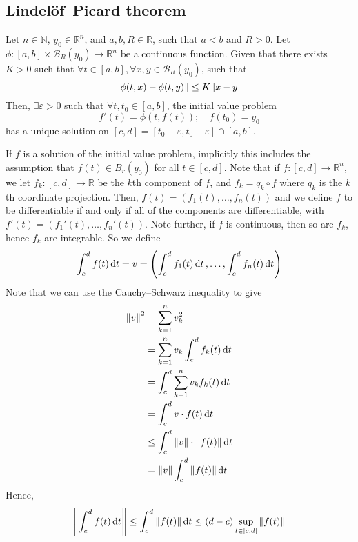 \subsection{Lindel\"of--Picard theorem}
\begin{theorem}
	Let \( n \in \mathbb N \), \( y_0 \in \mathbb R^n \), and \( a,b,R \in \mathbb R \), such that \( a < b \) and \( R > 0 \).
	Let \( \phi \colon [a,b] \times \mathcal B_R(y_0) \to \mathbb R^n \) be a continuous function.
	Given that there exists \( K > 0 \) such that \( \forall t \in [a,b], \forall x,y \in \mathcal B_R(y_0) \), such that
	\[
		\norm{\phi(t,x) - \phi(t,y)} \leq K \norm{x-y}
	\]
	Then, \( \exists \varepsilon > 0 \) such that \( \forall t, t_0 \in [a,b] \), the initial value problem
	\[
		f'(t) = \phi(t, f(t));\quad f(t_0) = y_0
	\]
	has a unique solution on \( [c,d] = [t_0 - \varepsilon, t_0 + \varepsilon] \cap [a,b] \).
\end{theorem}
\begin{remark}
	If \( f \) is a solution of the initial value problem, implicitly this includes the assumption that \( f(t) \in B_r(y_0) \) for all \( t \in [c,d] \).
	Note that if \( f \colon [c,d] \to \mathbb R^n \), we let \( f_k \colon [c,d] \to \mathbb R \) be the \( k \)th component of \( f \), and \( f_k = q_k \circ f \) where \( q_k \) is the \( k \)th coordinate projection.
	Then, \( f(t) = (f_1(t), \dots, f_n(t)) \) and we define \( f \) to be differentiable if and only if all of the components are differentiable, with \( f'(t) = (f_1'(t), \dots, f_n'(t)) \).
	Note further, if \( f \) is continuous, then so are \( f_k \), hence \( f_k \) are integrable.
	So we define
	\[
		\int_c^d f(t) \dd{t} = v = \qty(\int_c^d f_1(t) \dd{t}, \dots, \int_c^d f_n(t) \dd{t})
	\]
	Note that we can use the Cauchy--Schwarz inequality to give
	\begin{align*}
		\norm{v}^2 & = \sum_{k=1}^n v_k^2                            \\
		           & = \sum_{k=1}^n v_k \int_c^d f_k(t) \dd{t}       \\
		           & = \int_c^d \sum_{k=1}^n v_k f_k(t) \dd{t}       \\
		           & = \int_c^d v \cdot f(t) \dd{t}                  \\
		           & \leq \int_c^d \norm{v} \cdot \norm{f(t)} \dd{t} \\
		           & = \norm{v} \int_c^d \norm{f(t)} \dd{t}
	\end{align*}
	Hence,
	\[
		\norm{\int_c^d f(t) \dd{t}} \leq \int_c^d \norm{f(t)} \dd{t} \leq (d-c) \sup_{t \in [c,d]} \norm{f(t)}
	\]
\end{remark}
